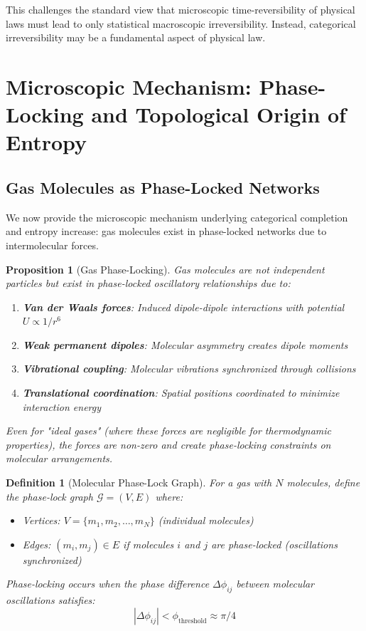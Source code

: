 \documentclass[12pt,a4paper]{article}
\newtheorem{definition}[theorem]{Definition}
\newtheorem{proposition}[theorem]{Proposition}
\theoremstyle{remark}
\begin{document}
This challenges the standard view that microscopic time-reversibility of physical laws must lead to only statistical macroscopic irreversibility. Instead, categorical irreversibility may be a fundamental aspect of physical law.

\section{Microscopic Mechanism: Phase-Locking and Topological Origin of Entropy}

\subsection{Gas Molecules as Phase-Locked Networks}

We now provide the microscopic mechanism underlying categorical completion and entropy increase: gas molecules exist in phase-locked networks due to intermolecular forces.

\begin{proposition}[Gas Phase-Locking]
\label{prop:gas_phase_lock}
Gas molecules are not independent particles but exist in phase-locked oscillatory relationships due to:
\begin{enumerate}
\item \textbf{Van der Waals forces}: Induced dipole-dipole interactions with potential $U \propto 1/r^6$
\item \textbf{Weak permanent dipoles}: Molecular asymmetry creates dipole moments
\item \textbf{Vibrational coupling}: Molecular vibrations synchronized through collisions
\item \textbf{Translational coordination}: Spatial positions coordinated to minimize interaction energy
\end{enumerate}

Even for "ideal gases" (where these forces are negligible for thermodynamic properties), the forces are non-zero and create phase-locking constraints on molecular arrangements.
\end{proposition}

\begin{definition}[Molecular Phase-Lock Graph]
For a gas with $N$ molecules, define the phase-lock graph $\mathcal{G} = (V, E)$ where:
\begin{itemize}
\item Vertices: $V = \{m_1, m_2, \ldots, m_N\}$ (individual molecules)
\item Edges: $(m_i, m_j) \in E$ if molecules $i$ and $j$ are phase-locked (oscillations synchronized)
\end{itemize}

Phase-locking occurs when the phase difference $\Delta\phi_{ij}$ between molecular oscillations satisfies:
\begin{equation}
|\Delta\phi_{ij}| < \phi_{\text{threshold}} \approx \pi/4
\end{equation}
\end{definition}
\end{document}
